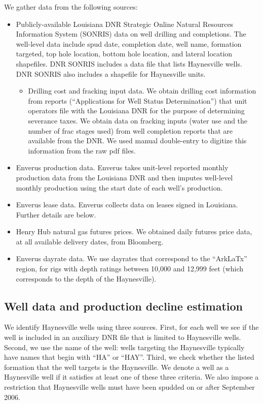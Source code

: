 \documentclass[12pt]{article}
\begin{document}
We gather data from the following sources:
\begin{itemize}
\item Publicly-available Louisiana DNR Strategic Online Natural Resources Information System (SONRIS) data on well drilling and completions. The well-level data include spud date, completion date, well name, formation targeted, top hole location, bottom hole location, and lateral location shapefiles. DNR SONRIS includes  a data file that lists Haynesville wells. DNR SONRIS also includes a shapefile for Haynesville units.
\begin{itemize}
\item Drilling cost and fracking input data. We obtain drilling cost information from reports (``Applications for Well Status Determination'') that unit operators file with the Louisiana DNR for the purpose of determining severance taxes. We obtain data on fracking inputs (water use and the number of frac stages used) from well completion reports that are available from the DNR. We used manual double-entry to digitize this information from the raw pdf files.
\end{itemize}
\item Enverus production data. Enverus takes unit-level reported monthly production data from the Louisiana DNR and then imputes well-level monthly production using the start date of each well's production.
\item Enverus lease data. Enverus collects data on leases signed in Louisiana. Further details are below.
\item Henry Hub natural gas futures prices. We obtained daily futures price data, at all available delivery dates, from Bloomberg.
\item Enverus dayrate data. We use dayrates that correspond to the ``ArkLaTx'' region, for rigs with depth ratings between 10,000 and 12,999 feet (which corresponds to the depth of the Haynesville).
\end{itemize}


\subsection{Well data and production decline estimation \label{appx:decline}}

We identify Haynesville wells using three sources. First, for each well we see if the well is included in an auxiliary DNR file that is limited to Haynesville wells. Second, we use the name of the well: wells targeting the Haynesville typically have names that begin with ``HA'' or ``HAY''. Third, we check whether the listed formation that the well targets is the Haynesville. We denote a well as a Haynesville well if it satisfies at least one of these three criteria. We also impose a restriction that Haynesville wells must have been spudded on or after September 2006.
\end{document}
